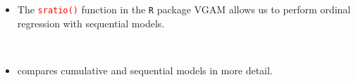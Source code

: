 \documentclass{beamer}
\newcommand{\currentsubsection}{}
\let\oldsubsection\subsection
\renewcommand{\subsection}[1]{\oldsubsection{#1}\renewcommand{\currentsubsection}{#1}}
\begin{document}
\begin{frame}
\begin{itemize}





\item 
The \textcolor{red}{ \texttt{sratio()}} function in the \texttt{R} package VGAM  allows us to perform ordinal regression with sequential models. 

\ \
\item
\cite[Sec. 9.3.3]{tutz2012} compares  cumulative and sequential models in more detail. 
\end{itemize}
\end{frame}
%
%
%
%
%
\end{document}
